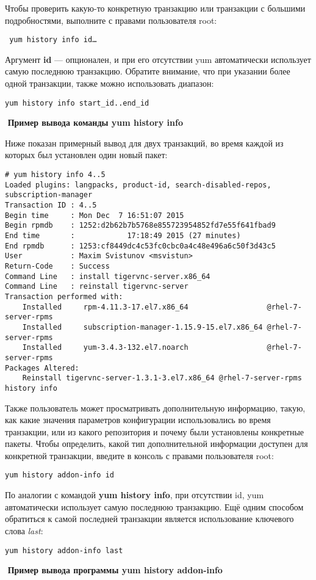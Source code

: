 \documentclass[a4paper,10pt,twoside]{article}
\begin{document}
Чтобы проверить какую-то конкретную транзакцию или транзакции с большими подробностями, выполните с правами пользователя root: 
\begin{verbatim}
 yum history info id…
\end{verbatim} 
Аргумент \textbf{id} — опционален, и при его отсутствии yum автоматически использует самую последнюю транзакцию. Обратите внимание, что при указании более одной транзакции, также можно использовать диапазон:
\begin{verbatim}
yum history info start_id..end_id
\end{verbatim} 
⁠
\textbf{Пример вывода команды yum history info}


Ниже показан примерный вывод для двух транзакций, во время каждой из которых был установлен один новый пакет:
\begin{verbatim}
# yum history info 4..5
Loaded plugins: langpacks, product-id, search-disabled-repos, subscription-manager
Transaction ID : 4..5
Begin time     : Mon Dec  7 16:51:07 2015
Begin rpmdb    : 1252:d2b62b7b5768e855723954852fd7e55f641fbad9
End time       :            17:18:49 2015 (27 minutes)
End rpmdb      : 1253:cf8449dc4c53fc0cbc0a4c48e496a6c50f3d43c5
User           : Maxim Svistunov <msvistun>
Return-Code    : Success
Command Line   : install tigervnc-server.x86_64
Command Line   : reinstall tigervnc-server
Transaction performed with:
    Installed     rpm-4.11.3-17.el7.x86_64                  @rhel-7-server-rpms
    Installed     subscription-manager-1.15.9-15.el7.x86_64 @rhel-7-server-rpms
    Installed     yum-3.4.3-132.el7.noarch                  @rhel-7-server-rpms
Packages Altered:
    Reinstall tigervnc-server-1.3.1-3.el7.x86_64 @rhel-7-server-rpms
history info
\end{verbatim} 


Также пользователь может просматривать дополнительную информацию, такую, как какие значения параметров конфигурации использовались во время транзакции, или из какого репозитория и почему были установлены конкретные пакеты. Чтобы определить, какой тип дополнительной информации доступен для конкретной транзакции, введите в консоль с правами пользователя root: 

\begin{verbatim}
yum history addon-info id\end{verbatim} 
По аналогии с командой \textbf{yum history info}, при отсутствии id, yum автоматически использует самую последнюю транзакцию. Ещё одним способом обратиться к самой последней транзакции является использование ключевого слова \textit{last}:
\begin{verbatim}
yum history addon-info last
\end{verbatim} 
⁠
\textbf{Пример вывода программы yum history addon-info}
\end{document}
